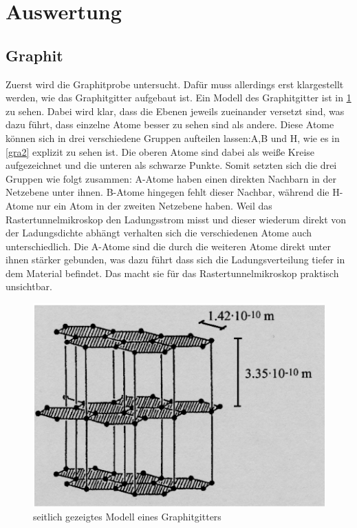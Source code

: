 \documentclass[
	a4paper,
	12pt,
	pagesize,
	ngerman
]{scrartcl}
\begin{document}
\section{Auswertung}
\subsection{Graphit}
Zuerst wird die Graphitprobe untersucht. Dafür muss allerdings erst klargestellt werden, wie das Graphitgitter aufgebaut ist. Ein Modell des Graphitgitter ist in \cref{gra1} zu sehen. Dabei wird klar, dass die Ebenen jeweils zueinander versetzt sind, was dazu führt, dass einzelne Atome besser zu sehen sind als andere. Diese Atome können sich in drei verschiedene Gruppen aufteilen lassen:A,B und H, wie es in \cref{gra2} explizit zu sehen ist. Die oberen Atome sind dabei als weiße Kreise aufgezeichnet und die unteren als schwarze Punkte. Somit setzten sich die drei Gruppen wie folgt zusammen: A-Atome haben einen direkten Nachbarn in der Netzebene unter ihnen. B-Atome hingegen fehlt dieser Nachbar, während die H-Atome nur ein Atom in der zweiten Netzebene haben. Weil das Rastertunnelmikroskop den Ladungsstrom misst und dieser wiederum direkt von der Ladungsdichte abhängt verhalten sich die verschiedenen Atome auch unterschiedlich. Die A-Atome sind die durch die weiteren Atome direkt unter ihnen stärker gebunden, was dazu führt dass sich die Ladungsverteilung tiefer in dem Material befindet. Das macht sie für das Rastertunnelmikroskop praktisch unsichtbar.

\begin{figure}[h!]
	\centering
	\includegraphics[scale=0.7]{graphitgitter1.png}
	\caption{seitlich gezeigtes Modell eines Graphitgitters}
	\label{gra1}
\end{figure}
\end{document}

